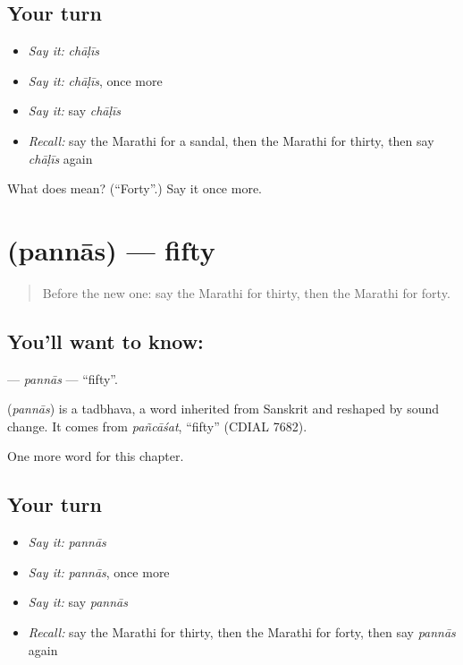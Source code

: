 \subsection*{Your turn}
\begin{itemize}
\raggedright
  \item \emph{Say it:} \emph{chāḷīs}
  \item \emph{Say it:} \emph{chāḷīs}, once more
  \item \emph{Say it:} say \emph{chāḷīs}
  \item \emph{Recall:} say the Marathi for a sandal, then the Marathi for thirty, then say \emph{chāḷīs} again
\end{itemize}

\begin{tcolorbox}[breakable,colback=teal!4,colframe=teal!35!black,title={Before you move on}]
What does  mean? (\textquotedblleft{}Forty\textquotedblright{}.) Say it once more.
\end{tcolorbox}
\section[\texorpdfstring{\mr{पन्नास} (pannās)}{पन्नास (pannās)}]{ (pannās) — fifty}

\label{lesson:MR-C118-pannas}



\begin{quote}
Before the new one: say the Marathi for thirty, then the Marathi for forty.
\end{quote}

\subsection*{You'll want to know: }
\textbf{} — \emph{pannās} — \textquotedblleft{}fifty\textquotedblright{}.

\begin{cousinweb}
\textbf{} (\emph{pannās}) is a tadbhava, a word inherited from Sanskrit and reshaped by sound change. It comes from \emph{pañcāśat}, \textquotedblleft{}fifty\textquotedblright{} (CDIAL 7682).
\end{cousinweb}

\begin{grammarlens}[title={What you've built}]
One more word for this chapter.
\end{grammarlens}

\subsection*{Your turn}
\begin{itemize}
\raggedright
  \item \emph{Say it:} \emph{pannās}
  \item \emph{Say it:} \emph{pannās}, once more
  \item \emph{Say it:} say \emph{pannās}
  \item \emph{Recall:} say the Marathi for thirty, then the Marathi for forty, then say \emph{pannās} again
\end{itemize}

